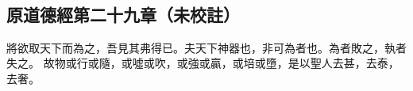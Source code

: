 ﻿%
%

\chapter{~}

\section{原道德經第二十九章（未校註）}

\begin{withgezhu}

\zhsong


將欲取天下而為之，吾見其弗得已。夫天下神器也，非可為者也。為者敗之，執者失之。
\textcolor{tongjia-color}{故物或行或隨，或噓或吹，或強或贏，或培或墮，是以聖人去甚，去泰，去奢。}

\end{withgezhu}
